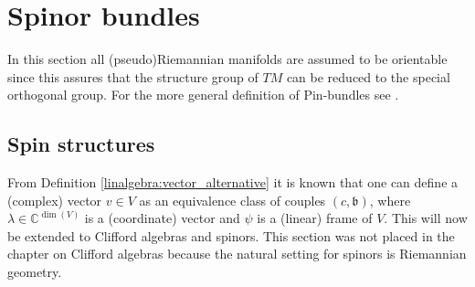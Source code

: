 
\section{Spinor bundles}\label{section:spinor_bundles}

    In this section all (pseudo)Riemannian manifolds are assumed to be orientable since this assures that the structure group of $TM$ can be reduced to the special orthogonal group. For the more general definition of $\mathrm{Pin}$-bundles see \cite{AMP2}.

\subsection{Spin structures}

    From Definition \ref{linalgebra:vector_alternative} it is known that one can define a (complex) vector $v\in V$ as an equivalence class of couples $(c,\mathfrak{b})$, where $\lambda\in\mathbb{C}^{\dim(V)}$ is a (coordinate) vector and $\psi$ is a (linear) frame of $V$. This will now be extended to Clifford algebras and spinors. This section was not placed in the chapter on Clifford algebras because the natural setting for spinors is Riemannian geometry.

